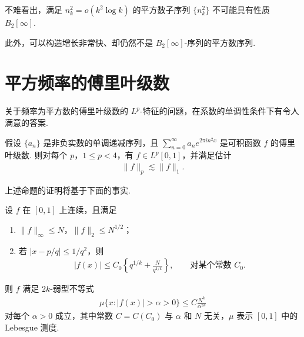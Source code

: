 \begin{remark}\label{rem:8.6}
不难看出，满足 $n_k^2 = o(k^2\log k)$ 的平方数子序列 $\{n_k^2\}$ 不可能具有性质 $B_2[\infty]$.

此外，可以构造增长非常快、却仍然不是 $B_2[\infty]$-序列的平方数序列.
\end{remark}

\section{平方频率的傅里叶级数}

关于频率为平方数的傅里叶级数的 $L^{p}$-特征的问题，在系数的单调性条件下有令人满意的答案.

\begin{proposition}\label{prop:8.7}
假设 $\{a_n\}$ 是非负实数的单调递减序列，且 $\sum_{n=0}^{\infty} a_n e^{2\pi i n^2x}$ 是可积函数 $f$ 的傅里叶级数. 则对每个 $p$，$1 \leq p < 4$，有 $f \in L^p[0,1]$，并满足估计
\begin{align*}
  \|f\|_{p}\lesssim\|f\|_{1}.
\end{align*}
\end{proposition}

上述命题的证明将基于下面的事实.

\begin{lemma}\label{lem:8.8}
设 $f$ 在 $[0, 1]$ 上连续，且满足
\begin{enumerate}
\item[(i)] $\|f\|_{\infty} \leq N$，$\|f\|_2 \leq N^{1/2}$；
\item[(ii)] 若 $|x - p/q| \leq 1/q^2$，则
\begin{align*}
  |f(x)|\leq C_{0}\left\{q^{1/k}+\frac{N}{q^{1/k}}\right\},\qquad \text{对某个常数 } C_{0}.
\end{align*}
\end{enumerate}
则 $f$ 满足 $2k$-弱型不等式
\begin{align*}
  \mu\{x:|f(x)|>\alpha>0\}\leq C\frac{N^{k}}{\alpha^{2k}}
\end{align*}
对每个 $\alpha > 0$ 成立，其中常数 $C = C(C_0)$ 与 $\alpha$ 和 $N$ 无关，$\mu$ 表示 $[0,1]$ 中的 Lebesgue 测度.
\end{lemma}

